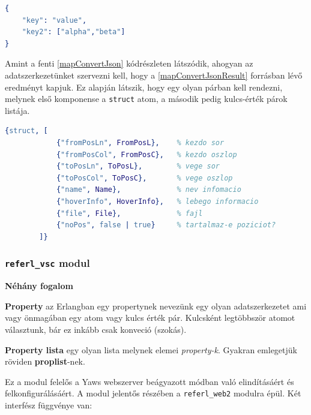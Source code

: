 \lstset{caption=Átalakított példa szótár, label=mapConvertJsonResult} 
\begin{lstlisting}[language={erlang}] 
{
    "key": "value",
    "key2": ["alpha","beta"]
}
\end{lstlisting}

Amint a fenti \ref{mapConvertJson} kódrészleten látszódik, ahogyan az adatszerkezetünket szervezni kell, hogy a \ref{mapConvertJsonResult} forrásban lévő eredményt kapjuk. Ez alapján látszik, hogy egy olyan párban kell rendezni, melynek első komponense a \lstinline{struct} atom, a második pedig kulcs-érték párok listája.


\lstset{caption=Egy lekérdezés egyetlen elemének reprezentációja, label=structQueryRes}
\begin{lstlisting}[language={erlang}]
{struct, [
            {"fromPosLn", FromPosL},    % kezdo sor
            {"fromPosCol", FromPosC},   % kezdo oszlop
            {"toPosLn", ToPosL},        % vege sor
            {"toPosCol", ToPosC},       % vege oszlop
            {"name", Name},             % nev infomacio
            {"hoverInfo", HoverInfo},   % lebego informacio
            {"file", File},             % fajl
            {"noPos", false | true}     % tartalmaz-e poziciot?
        ]}
\end{lstlisting}

\newpage

\subsubsection{\lstinline{referl_vsc} modul}

\noindent \textbf{Néhány fogalom}

\vspace{14pt}
\noindent \textbf{Property} az Erlangban egy propertynek nevezünk egy olyan adatszerkezetet  ami vagy önmagában egy atom vagy kulcs érték pár. Kulcsként legtöbbször atomot választunk, bár ez inkább csak konveció (szokás).

\vspace{14pt}
\noindent \textbf{Property lista} egy olyan lista melynek elemei \textit{property-k}. Gyakran emlegetjük röviden \textbf{proplist}-nek.

\vspace{14pt}
Ez a modul felelős a Yaws webszerver beágyazott módban való elindításáért és felkonfigurálásáért. \cite{zacharyYawsBook}
A modul jelentős részében a \lstinline{referl_web2} modulra épül. Két interfész függvénye van:

